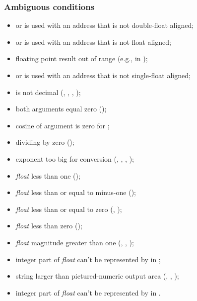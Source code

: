 \subsubsection{Ambiguous conditions} %
\label{float:ambiguous}
\begin{itemize}
\item {} or  is used with an address that is not
	double-float aligned;
\item {} or  is used with an address that is not
	float aligned;
\item floating point result out of range
	(e.g., in );
\item {} or  is used with an address that is not
	single-float aligned;
\item {} is not decimal
	(,
	 ,
	 ,
	 );
\item both arguments equal zero ();
\item cosine of argument is zero for ;
\item dividing by zero ();
\item exponent too big for conversion
	(,
	 ,
	 ,
	 );
\item \emph{float} less than one ();
\item \emph{float} less than or equal to minus-one
	();
\item \emph{float} less than or equal to zero
	(,
	 );
\item \emph{float} less than zero
	();
\item \emph{float} magnitude greater than one
	(,
	 ,
	 );
\item integer part of \emph{float} can't be represented by  in
	;
\item string larger than pictured-numeric output area
	(,
	 ,
	 );
\item integer part of \emph{float} can't be represented
	by  in .
\end{itemize}

